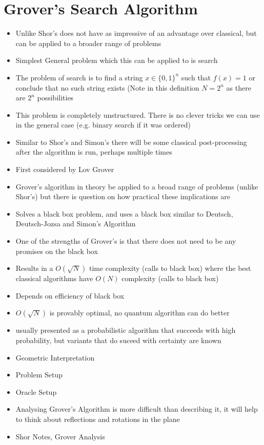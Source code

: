 \documentclass[12pt,twoside,fleqn]{report}
\theoremstyle{thmstyle}
\begin{document}
\section{Grover's Search Algorithm}
\begin{itemize}
\item Unlike Shor's does not have as impressive of an advantage over classical, but can be applied to a broader range of problems
\item Simplest General problem which this can be applied to is search
\item The problem of search is to find a string $x \in \{0,1 \}^n$ such that $f(x) = 1$ or conclude that no such string exists (Note in this definition $N = 2^n$ as there are $2^n$ possibilities
\item This problem is completely unstructured. There is no clever tricks we can use in the general case (e.g. binary search if it was ordered)
\item Similar to Shor's and Simon's there will be some classical post-processing after the algorithm is run, perhaps multiple times
\item First considered by Lov Grover
\item Grover's algorithm in theory be applied to a broad range of problems (unlike Shor's) but there is question on how practical these implications are
\item Solves a black box problem, and uses a black box similar to Deutsch, Deutsch-Jozsa and Simon's Algorithm
\item One of the strengths of Grover's is that there does not need to be any promises on the black box
\item Results in a $O(\sqrt{N})$ time complexity (calls to black box) where the best classical algorithms have $O(N)$ complexity (calls to black box)
\item Depends on efficiency of black box
\item $O(\sqrt{N})$ is provably optimal, no quantum algorithm can do better
\item usually presented as a probabilistic algorithm that succeeds with high probability, but variants that do suceed with certainty are known
\item Geometric Interpretation
\item Problem Setup
\item Oracle Setup
\item Analysing Grover's Algorithm is more difficult than describing it, it will help to think about reflections and rotations in the plane
\item Shor Notes, Grover Analysis
\end{itemize}
\end{document}
